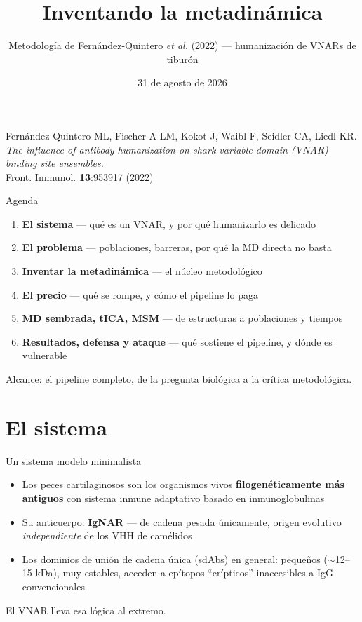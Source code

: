 \documentclass[aspectratio=169,11pt]{beamer}
\title{Inventando la metadinámica}
\subtitle{Metodología de Fernández-Quintero \emph{et al.} (2022) — humanización de VNARs de tiburón}
\author{}
\date{31 de agosto de 2026}
\newcommand{\Fuente}[1]{{\scriptsize\color{migris} #1}}
\begin{document}
\begin{frame}
  \titlepage
  \vspace{-1em}
  \begin{center}
    \small Fernández-Quintero ML, Fischer A-LM, Kokot J, Waibl F, Seidler CA, Liedl KR.\\
    \textit{The influence of antibody humanization on shark variable domain (VNAR) binding site ensembles.}\\
    Front. Immunol. \textbf{13}:953917 (2022)
  \end{center}
\end{frame}

\begin{frame}{Agenda}
  \begin{enumerate}
    \setlength{\itemsep}{0.55em}
    \item \textbf{El sistema} — qué es un VNAR, y por qué humanizarlo es delicado
    \item \textbf{El problema} — poblaciones, barreras, por qué la MD directa no basta
    \item \textbf{Inventar la metadinámica} — el núcleo metodológico
    \item \textbf{El precio} — qué se rompe, y cómo el pipeline lo paga
    \item \textbf{MD sembrada, tICA, MSM} — de estructuras a poblaciones y tiempos
    \item \textbf{Resultados, defensa y ataque} — qué sostiene el pipeline, y dónde es vulnerable
  \end{enumerate}
  \vspace{0.6em}
  \Fuente{Alcance: el pipeline completo, de la pregunta biológica a la crítica metodológica.}
\end{frame}

\section{El sistema}

\begin{frame}{Un sistema modelo minimalista}
  \begin{itemize}
    \item Los peces cartilaginosos son los organismos vivos \textbf{filogenéticamente más antiguos} con sistema inmune adaptativo basado en inmunoglobulinas
    \item Su anticuerpo: \textbf{IgNAR} — de cadena pesada únicamente, origen evolutivo \emph{independiente} de los VHH de camélidos
    \item Los dominios de unión de cadena única (sdAbs) en general: pequeños ($\sim$12--15 kDa), muy estables, acceden a epítopos ``crípticos'' inaccesibles a IgG convencionales
  \end{itemize}
  \vspace{0.8em}
  \centering \alert{El VNAR lleva esa lógica al extremo.}
\end{frame}
\end{document}
